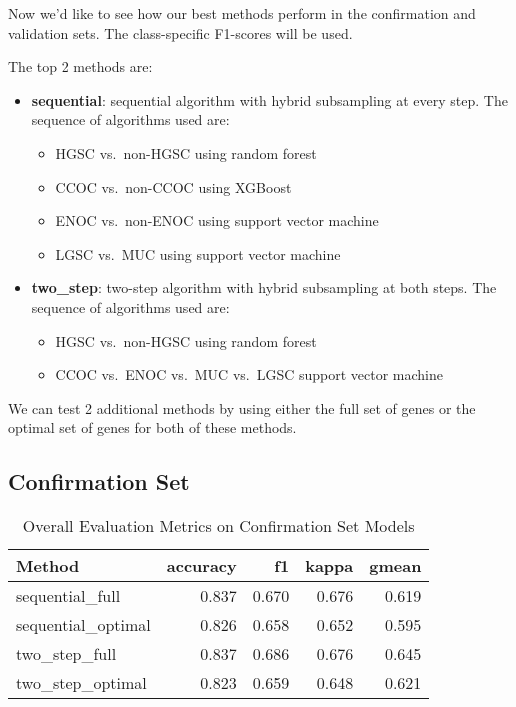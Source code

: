 \documentclass[
]{report}
\providecommand{\tightlist}{%
  \setlength{\itemsep}{0pt}\setlength{\parskip}{0pt}}
\begin{document}
Now we'd like to see how our best methods perform in the confirmation and validation sets. The class-specific F1-scores will be used.

The top 2 methods are:

\begin{itemize}
\tightlist
\item
  \textbf{sequential}: sequential algorithm with hybrid subsampling at every step. The sequence of algorithms used are:

  \begin{itemize}
  \tightlist
  \item
    HGSC vs.~non-HGSC using random forest
  \item
    CCOC vs.~non-CCOC using XGBoost
  \item
    ENOC vs.~non-ENOC using support vector machine
  \item
    LGSC vs.~MUC using support vector machine
  \end{itemize}
\item
  \textbf{two\_step}: two-step algorithm with hybrid subsampling at both steps. The sequence of algorithms used are:

  \begin{itemize}
  \tightlist
  \item
    HGSC vs.~non-HGSC using random forest
  \item
    CCOC vs.~ENOC vs.~MUC vs.~LGSC support vector machine
  \end{itemize}
\end{itemize}

We can test 2 additional methods by using either the full set of genes or the optimal set of genes for both of these methods.

\hypertarget{confirmation-set}{%
\subsection{Confirmation Set}\label{confirmation-set}}

\begin{table}

\caption{\label{tab:conf-eval-overall}Overall Evaluation Metrics on Confirmation Set Models}
\centering
\begin{tabular}[t]{l|r|r|r|r}
\hline
Method & accuracy & f1 & kappa & gmean\\
\hline
sequential\_full & 0.837 & 0.670 & 0.676 & 0.619\\
\hline
sequential\_optimal & 0.826 & 0.658 & 0.652 & 0.595\\
\hline
two\_step\_full & 0.837 & 0.686 & 0.676 & 0.645\\
\hline
two\_step\_optimal & 0.823 & 0.659 & 0.648 & 0.621\\
\hline
\end{tabular}
\end{table}
\end{document}
